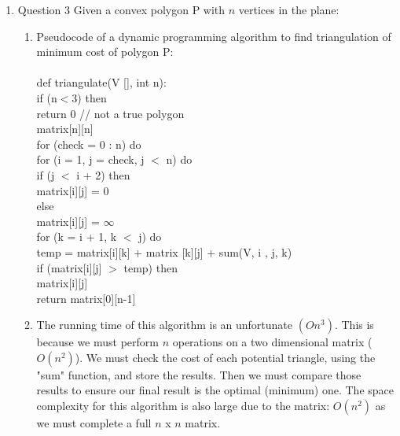\documentclass{article}
\newcommand\tab[1][1cm]{\hspace*{#1}}
\begin{document}
\begin{enumerate}
  \item Question 3
    Given a convex polygon P with $n$ vertices in the plane:\\
    \begin{enumerate}
      \item Pseudocode of a dynamic programming algorithm to find triangulation of minimum cost of polygon P:\\\\
        def triangulate(V [], int n):\\
        \tab if (n$<$3) then\\
        \tab \tab return 0 // not a true polygon\\
        \tab matrix[n][n] \\
        \tab for (check = 0 : n) do \\
        \tab \tab for (i = 1, j = check, j $<$ n) do\\
        \tab \tab \tab if (j $<$ i + 2) then \\
        \tab \tab \tab \tab matrix[i][j] = 0\\
        \tab \tab \tab else\\
        \tab \tab \tab \tab matrix[i][j] = $\infty$\\
        \tab \tab \tab \tab for (k = i + 1, k $<$ j) do\\
        \tab \tab \tab \tab \tab temp = matrix[i][k] + matrix [k][j] + sum(V, i , j, k)\\
        \tab \tab \tab \tab \tab if (matrix[i][j] $>$ temp) then\\
        \tab \tab \tab \tab \tab matrix[i][j] \\
        \tab return matrix[0][n-1]\\

      \item The running time of this algorithm is an unfortunate $(On^3)$. This is because we must perform
        $n$ operations on a two dimensional matrix ($O(n^2)$). We must check the cost of each potential
        triangle, using the "sum" function, and store the results. Then we must compare those results to
        ensure our final result is the optimal (minimum) one. The space complexity for this algorithm is
        also large due to the matrix: $O(n^2)$ as we must complete a full $n$ x $n$ matrix.

    \end{enumerate}


\end{enumerate}
\end{document}
